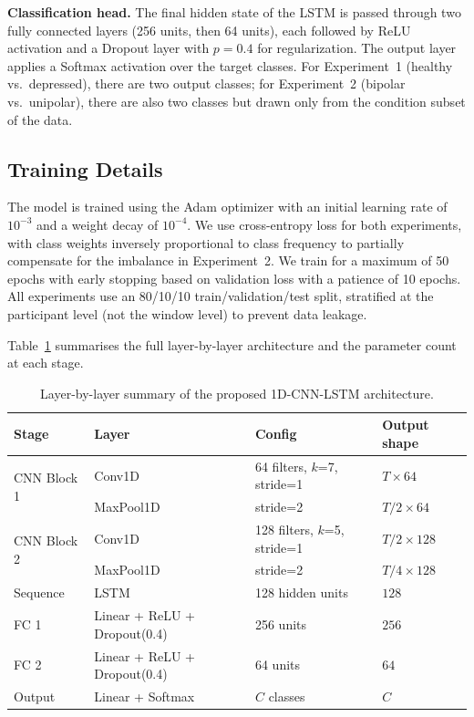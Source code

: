 \textbf{Classification head.}
The final hidden state of the LSTM is passed through two fully connected layers (256 units, then 64 units), each followed by ReLU activation and a Dropout layer with $p = 0.4$ for regularization. The output layer applies a Softmax activation over the target classes. For Experiment~1 (healthy vs.\ depressed), there are two output classes; for Experiment~2 (bipolar vs.\ unipolar), there are also two classes but drawn only from the condition subset of the data.

\subsection{Training Details}

The model is trained using the Adam optimizer with an initial learning rate of $10^{-3}$ and a weight decay of $10^{-4}$. We use cross-entropy loss for both experiments, with class weights inversely proportional to class frequency to partially compensate for the imbalance in Experiment~2. We train for a maximum of 50 epochs with early stopping based on validation loss with a patience of 10 epochs. All experiments use an 80/10/10 train/validation/test split, stratified at the participant level (not the window level) to prevent data leakage.

Table~\ref{tab:arch} summarises the full layer-by-layer architecture and the parameter count at each stage.

\begin{table}[h]
\centering
\caption{Layer-by-layer summary of the proposed 1D-CNN-LSTM architecture.}
\label{tab:arch}
\begin{tabular}{llll}
\hline
\textbf{Stage} & \textbf{Layer} & \textbf{Config} & \textbf{Output shape} \\
\hline
\multirow{2}{*}{CNN Block 1} & Conv1D & 64 filters, $k$=7, stride=1 & $T \times 64$ \\
                             & MaxPool1D & stride=2 & $T/2 \times 64$ \\
\multirow{2}{*}{CNN Block 2} & Conv1D & 128 filters, $k$=5, stride=1 & $T/2 \times 128$ \\
                             & MaxPool1D & stride=2 & $T/4 \times 128$ \\
Sequence                     & LSTM & 128 hidden units & $128$ \\
FC 1                         & Linear + ReLU + Dropout(0.4) & 256 units & $256$ \\
FC 2                         & Linear + ReLU + Dropout(0.4) & 64 units & $64$ \\
Output                       & Linear + Softmax & $C$ classes & $C$ \\
\hline
\end{tabular}
\end{table}